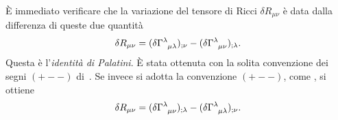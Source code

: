 È immediato verificare che la variazione del tensore di Ricci
$\delta R_{\mu\nu}$ è data dalla differenza di queste due quantità
\begin{equation}
  \delta R_{\mu\nu} = (\delta \tensor{\Gamma}{^{\lambda}_{\mu\lambda}})_{;\nu}
  - (\delta \tensor{\Gamma}{^{\lambda}_{\mu\nu}})_{;\lambda}.
\end{equation}
Questa è l'\emph{identità di Palatini}.  È stata
ottenuta con la solita convenzione dei segni $(+--)$
di~\textcite{weinberg:gravitation}.  Se invece si adotta la convenzione $(+--)$,
come \textcites{barone:relativita,landau:campi}, si ottiene
\begin{equation}
  \delta R_{\mu\nu} = (\delta \tensor{\Gamma}{^{\lambda}_{\mu\nu}})_{;\lambda} -
  (\delta \tensor{\Gamma}{^{\lambda}_{\mu\lambda}})_{;\nu}.
\end{equation}

